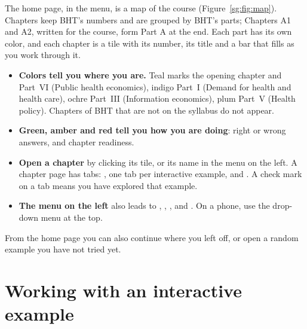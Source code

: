 The home page,  in the menu, is a map of the course (Figure~\ref{sg:fig:map}). Chapters keep BHT's numbers and are grouped by BHT's parts; Chapters A1 and A2, written for the course, form Part A at the end. Each part has its own color, and each chapter is a tile with its number, its title and a bar that fills as you work through it.
\begin{itemize}
  \item \textbf{Colors tell you where you are.} Teal marks the opening chapter and Part~VI (Public health economics), indigo Part~I (Demand for health and health care), ochre Part~III (Information economics), plum Part~V (Health policy). Chapters of BHT that are not on the syllabus do not appear.
  \item \textbf{Green, amber and red tell you how you are doing}: right or wrong answers, and chapter readiness.
  \item \textbf{Open a chapter} by clicking its tile, or its name in the menu on the left. A chapter page has tabs: , one tab per interactive example, and . A check mark on a tab means you have explored that example.
  \item \textbf{The menu on the left} also leads to , , ,  and . On a phone, use the drop-down menu at the top.
\end{itemize}
From the home page you can also continue where you left off, or open a random example you have not tried yet.


\section{Working with an interactive example}

